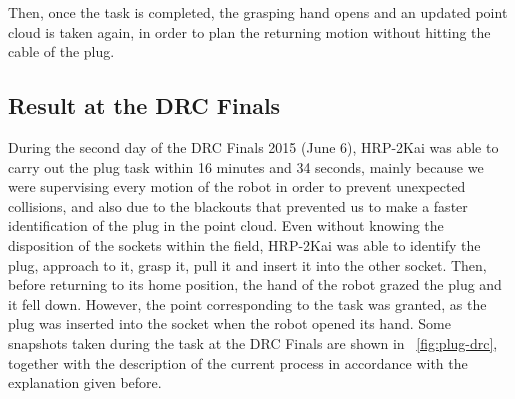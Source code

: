 		Then, once the task is completed, the grasping hand opens and an updated point cloud is taken again,
		in order to plan the returning motion without hitting the cable of the plug.
		
	\subsection{Result at the DRC Finals}
		
		During the second day of the DRC Finals 2015 (June 6), HRP-2Kai was able to carry out
		the plug task within 16 minutes and 34 seconds, mainly because we were supervising every motion of the
		robot in order to prevent unexpected collisions, and also due to the blackouts that prevented us to make
		a faster identification of the plug in the point cloud.
		Even without knowing the disposition of the sockets within the field, HRP-2Kai was able to identify the
		plug, approach to it, grasp it, pull it and insert it into the other socket.
		Then, before returning to its home position, the hand of the robot grazed the plug and it fell down.
		However, the point corresponding to the task was granted, as the plug was inserted into the socket
		when the robot opened its hand.
		Some snapshots taken during the task at the DRC Finals are shown in \figurename~\ref{fig:plug-drc},
		together with the description of the current process in accordance with the explanation given before.
		

